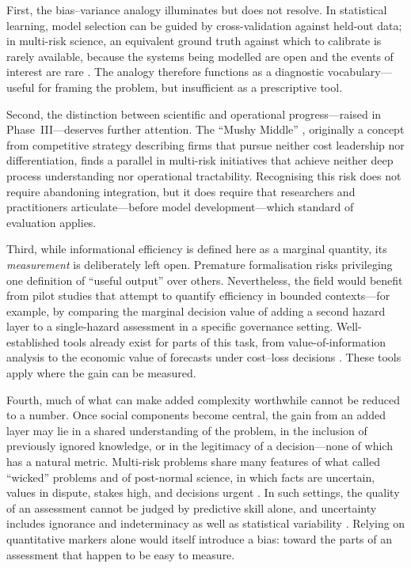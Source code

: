 \documentclass[12pt]{article}
\begin{document}
First, the bias--variance analogy illuminates but does not resolve. In statistical learning, model selection can be guided by cross-validation against held-out data; in multi-risk science, an equivalent ground truth against which to calibrate is rarely available, because the systems being modelled are open and the events of interest are rare \citep{oreskes1994verification}. The analogy therefore functions as a diagnostic vocabulary---useful for framing the problem, but insufficient as a prescriptive tool.

Second, the distinction between scientific and operational progress---raised in Phase~III---deserves further attention. The ``Mushy Middle'' \citep{stonehouse2007competitive}, originally a concept from competitive strategy describing firms that pursue neither cost leadership nor differentiation, finds a parallel in multi-risk initiatives that achieve neither deep process understanding nor operational tractability. Recognising this risk does not require abandoning integration, but it does require that researchers and practitioners articulate---before model development---which standard of evaluation applies.

Third, while informational efficiency is defined here as a marginal quantity, its \textit{measurement} is deliberately left open. Premature formalisation risks privileging one definition of ``useful output'' over others. Nevertheless, the field would benefit from pilot studies that attempt to quantify efficiency in bounded contexts---for example, by comparing the marginal decision value of adding a second hazard layer to a single-hazard assessment in a specific governance setting. Well-established tools already exist for parts of this task, from value-of-information analysis \citep{howard1966information, keisler2014value} to the economic value of forecasts under cost--loss decisions \citep{richardson2000skill, pappenberger2015monetary}. These tools apply where the gain can be measured.

Fourth, much of what can make added complexity worthwhile cannot be reduced to a number. Once social components become central, the gain from an added layer may lie in a shared understanding of the problem, in the inclusion of previously ignored knowledge, or in the legitimacy of a decision---none of which has a natural metric. Multi-risk problems share many features of what \citet{rittel1973dilemmas} called ``wicked'' problems and of post-normal science, in which facts are uncertain, values in dispute, stakes high, and decisions urgent \citep{funtowicz1993science}. In such settings, the quality of an assessment cannot be judged by predictive skill alone, and uncertainty includes ignorance and indeterminacy as well as statistical variability \citep{wynne1992uncertainty, walker2003defining}. Relying on quantitative markers alone would itself introduce a bias: toward the parts of an assessment that happen to be easy to measure.
\end{document}
